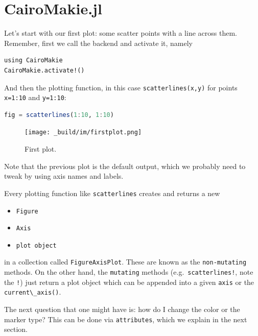 \documentclass[
  notoc %
]{tufte-book}
\providecommand{\tightlist}{%
  \setlength{\itemsep}{0pt}\setlength{\parskip}{0pt}
}
\newcommand{\passthrough}[1]{#1}
\begin{document}
\hypertarget{sec:cairomakie}{%
\section{CairoMakie.jl}\label{sec:cairomakie}}

Let's start with our first plot: some scatter points with a line across
them. Remember, first we call the backend and activate it, namely

\begin{lstlisting}
using CairoMakie
CairoMakie.activate!()
\end{lstlisting}

And then the plotting function, in this case
\passthrough{\lstinline!scatterlines(x,y)!} for points
\passthrough{\lstinline!x=1:10!} and \passthrough{\lstinline!y=1:10!}:

\begin{lstlisting}[language=Julia]
fig = scatterlines(1:10, 1:10)
\end{lstlisting}

\begin{figure}
\hypertarget{fig:firstplot}{%
\centering
\texttt{[image: \_build/im/firstplot.png]}
\caption{First plot.}\label{fig:firstplot}
}
\end{figure}

Note that the previous plot is the default output, which we probably
need to tweak by using axis names and labels.

Every plotting function like \passthrough{\lstinline!scatterlines!}
creates and returns a new

\begin{itemize}
\tightlist
\item
  \passthrough{\lstinline!Figure!}
\item
  \passthrough{\lstinline!Axis!}
\item
  \passthrough{\lstinline!plot object!}
\end{itemize}

in a collection called \passthrough{\lstinline!FigureAxisPlot!}. These
are known as the \passthrough{\lstinline!non-mutating!} methods. On the
other hand, the \passthrough{\lstinline!mutating!} methods
(e.g.~\passthrough{\lstinline"scatterlines!"}, note the
\passthrough{\lstinline"!"}) just return a plot object which can be
appended into a given \passthrough{\lstinline!axis!} or the
\passthrough{\lstinline!current\_axis()!}.

The next question that one might have is: how do I change the color or
the marker type? This can be done via
\passthrough{\lstinline!attributes!}, which we explain in the next
section.
\end{document}
